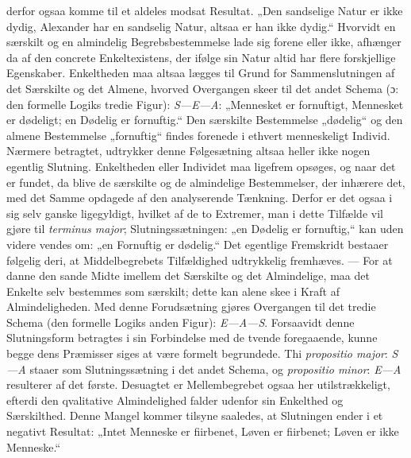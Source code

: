 \documentclass[12pt]{book}
\newcommand{\dsi}{\textup{ɔ:}}
\newcommand{\opage}[1]{\marginnote{\footnotesize\textit{[#1]}}}
\begin{document}
derfor ogsaa komme til et aldeles modsat Resultat. „Den sandselige Natur er ikke
dydig, Alexander har en sandselig Natur, altsaa er han ikke dydig.“ Hvorvidt en
særskilt og en almindelig Begrebsbestemmelse lade sig forene eller ikke, afhænger da
af den concrete Enkeltexistens, der ifølge sin Natur altid har flere forskjellige
Egenskaber. Enkeltheden maa altsaa lægges til Grund
\opage{76} for Sammenslutningen af det Særskilte og det Almene, hvorved Overgangen skeer til
det andet Schema (\dsi{} den formelle Logiks tredie Figur): \textit{S---E---A}:
„Mennesket er fornuftigt, Mennesket er dødeligt; en Dødelig er fornuftig.“ Den
særskilte Bestemmelse „dødelig“ og den almene Bestemmelse „fornuftig“ findes
forenede i ethvert menneskeligt Individ. Nærmere betragtet, udtrykker denne
Følgesætning altsaa heller ikke nogen egentlig Slutning. Enkeltheden eller Individet
maa ligefrem opsøges, og naar det er fundet, da blive de særskilte og de almindelige
Bestemmelser, der inhærere det, med det Samme opdagede af den analyserende Tænkning.
Derfor er det ogsaa i sig selv ganske ligegyldigt, hvilket af de to Extremer, man i
dette Tilfælde vil gjøre til \textit{terminus major}; Slutningssætningen: „en Dødelig
er fornuftig,“ kan uden videre vendes om: „en Fornuftig er dødelig.“ Det egentlige
Fremskridt bestaaer følgelig deri, at Middelbegrebets Tilfældighed udtrykkelig
fremhæves. --- For at danne den sande Midte imellem det Særskilte og det
Almindelige, maa det Enkelte selv bestemmes som særskilt; dette kan alene skee i
Kraft af Almindeligheden. Med denne Forudsætning gjøres Overgangen til det tredie
Schema (den formelle Logiks anden Figur): \textit{E---A---S}. Forsaavidt denne
Slutningsform betragtes i sin Forbindelse med de tvende foregaaende, kunne begge
dens Præmisser siges at være formelt begrundede. Thi \textit{propositio major}:
\textit{S---A} staaer som Slutningssætning i det andet Schema, og \textit{propositio
minor}: \textit{E---A} resulterer af det første. Desuagtet er Mellembegrebet ogsaa
her utilstrækkeligt, efterdi den qvalitative Almindelighed falder udenfor sin
Enkelthed og Særskilthed. Denne Mangel kommer tilsyne saaledes, at Slutningen ender
i et negativt Resultat: „Intet
\opage{77} %
Menneske er fiirbenet, Løven er fiirbenet; Løven er ikke Menneske.“
\end{document}
